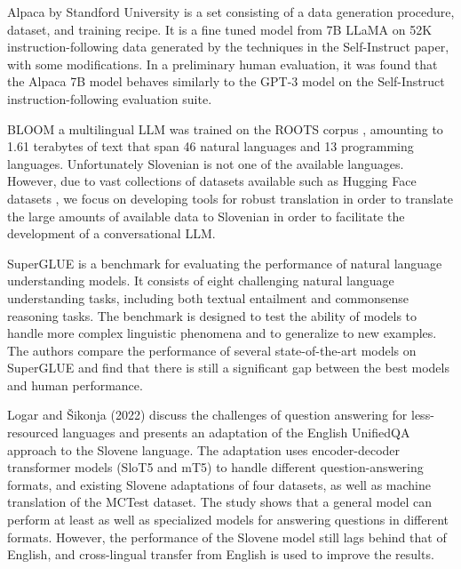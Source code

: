 \documentclass[fleqn,moreauthors,10pt]{ds_report}
\begin{document}
Alpaca \cite{alpaca} by Standford University is a set consisting of a data generation procedure, dataset, and training recipe. It is a fine tuned model from 7B LLaMA \cite{touvron2023llama} on 52K instruction-following data generated by the techniques in the Self-Instruct \cite{wang2022selfinstruct} paper, with some modifications. In a preliminary human evaluation, it was found that the Alpaca 7B model behaves similarly to the GPT-3 model on the Self-Instruct instruction-following evaluation suite.

BLOOM \cite{scao2022bloom} a multilingual LLM  was trained on the ROOTS corpus \cite{roots}, amounting to 1.61 terabytes of text that span 46 natural languages and 13 programming languages. Unfortunately Slovenian is not one of the available languages. However, due to vast collections of datasets available such as  Hugging Face datasets \cite{lhoest2021datasets}, we focus on developing tools for robust translation in order to translate the large amounts of available data to Slovenian in order to facilitate the development of a conversational LLM.


SuperGLUE \cite{wang2019superglue} is a benchmark for evaluating the performance of natural language understanding models. It consists of eight challenging natural language understanding tasks, including both textual entailment and commonsense reasoning tasks. The benchmark is designed to test the ability of models to handle more complex linguistic phenomena and to generalize to new examples. The authors compare the performance of several state-of-the-art models on SuperGLUE and find that there is still a significant gap between the best models and human performance.

Logar and Šikonja (2022) \cite{logar2022unified} discuss the challenges of question answering for less-resourced languages and presents an adaptation of the English UnifiedQA approach to the Slovene language. The adaptation uses encoder-decoder transformer models (SloT5 and mT5) to handle different question-answering formats, and existing Slovene adaptations of four datasets, as well as machine translation of the MCTest dataset. The study shows that a general model can perform at least as well as specialized models for answering questions in different formats. However, the performance of the Slovene model still lags behind that of English, and cross-lingual transfer from English is used to improve the results.
\end{document}

